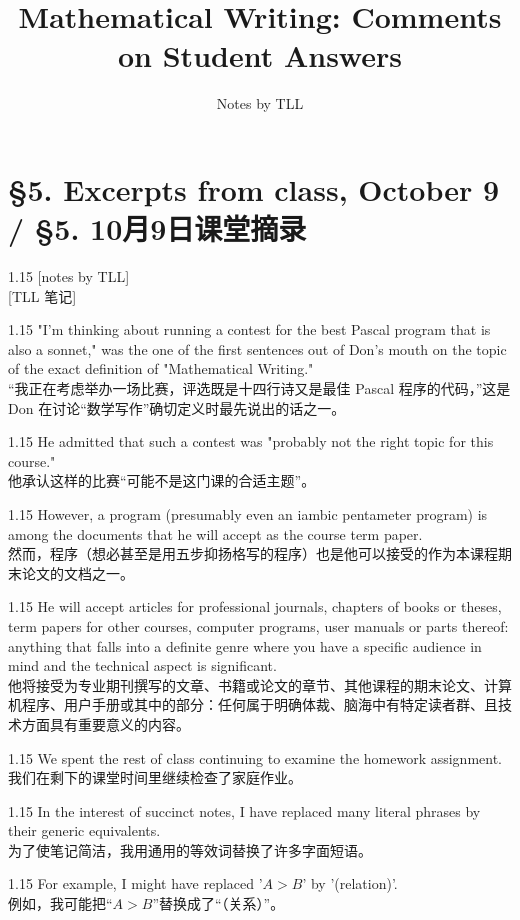 \documentclass[12pt,a4paper]{article}
\newcommand{\bilingual}[2]{
    \begin{spacing}{1.15} %
        \noindent \normalsize #1 \\[-0.5ex] %
        \small \textcolor{blue!70!black}{#2} %
    \end{spacing}
    \vspace{0.8em} %
}
\begin{document}
\title{Mathematical Writing: Comments on Student Answers}
\author{Notes by TLL}
\date{}
\maketitle

\section*{§5. Excerpts from class, October 9 / §5. 10月9日课堂摘录} %

\bilingual{[notes by TLL]}
{[TLL 笔记]} %

\bilingual{"I'm thinking about running a contest for the best Pascal program that is also a sonnet," was the one of the first sentences out of Don's mouth on the topic of the exact definition of "Mathematical Writing."}
{“我正在考虑举办一场比赛，评选既是十四行诗又是最佳 Pascal 程序的代码，”这是 Don 在讨论“数学写作”确切定义时最先说出的话之一。} %

\bilingual{He admitted that such a contest was "probably not the right topic for this course."}
{他承认这样的比赛“可能不是这门课的合适主题”。} %

\bilingual{However, a program (presumably even an iambic pentameter program) is among the documents that he will accept as the course term paper.}
{然而，程序（想必甚至是用五步抑扬格写的程序）也是他可以接受的作为本课程期末论文的文档之一。} %

\bilingual{He will accept articles for professional journals, chapters of books or theses, term papers for other courses, computer programs, user manuals or parts thereof: anything that falls into a definite genre where you have a specific audience in mind and the technical aspect is significant.}
{他将接受为专业期刊撰写的文章、书籍或论文的章节、其他课程的期末论文、计算机程序、用户手册或其中的部分：任何属于明确体裁、脑海中有特定读者群、且技术方面具有重要意义的内容。} %

\bilingual{We spent the rest of class continuing to examine the homework assignment.}
{我们在剩下的课堂时间里继续检查了家庭作业。} %

\bilingual{In the interest of succinct notes, I have replaced many literal phrases by their generic equivalents.}
{为了使笔记简洁，我用通用的等效词替换了许多字面短语。} %

\bilingual{For example, I might have replaced '$A>B$' by '(relation)'.}
{例如，我可能把“$A>B$”替换成了“（关系）”。} %
\end{document}
